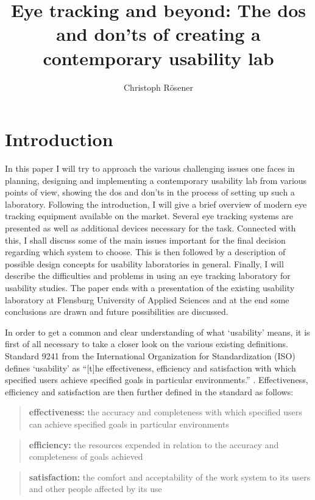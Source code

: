 \documentclass[output=paper]{langsci/langscibook}
\author{%
 Christoph Rösener
\affiliation{Johannes Gutenberg University of Mainz/Germersheim}
}
\title{Eye tracking and beyond: The dos and don'ts of creating a contemporary usability lab}
\begin{document}
\section{Introduction}

In this paper I will try to approach the various challenging issues one faces in planning, designing and implementing a contemporary usability lab from various points of view, showing the dos and don'ts in the process of setting up such a laboratory. Following the introduction, I will give a brief overview of modern eye tracking equipment available on the market. Several eye tracking systems are presented as well as additional devices necessary for the task. Connected with this, I shall discuss some of the main issues important for the final decision regarding which system to choose. This is then followed by a description of possible design concepts for usability laboratories in general. Finally, I will describe the difficulties and problems in using an eye tracking laboratory for usability studies. The paper ends with a presentation of the existing usability laboratory at Flensburg University of Applied Sciences and at the end some conclusions are drawn and future possibilities are discussed.


In order to get a common and clear understanding of what `usability' means, it is first of all necessary to take a closer look on the various existing definitions. Standard 9241 from the International Organization for Standardization (ISO) defines `usability' as ``[t]he effectiveness, efficiency and satisfaction with which specified users achieve specified goals in particular environments.'' \citep{ISO9241}. Effectiveness, efficiency and satisfaction are then further defined in the standard as follows: 


\begin{quote}
\textbf{effectiveness: }the accuracy and completeness with which specified users can achieve specified goals in particular environments
\end{quote}

\begin{quote}
\textbf{efficiency:} the resources expended in relation to the accuracy and completeness of goals achieved
\end{quote}

\begin{quote}
\textbf{satisfaction:} the comfort and acceptability of the work system to its users and other people affected by its use
\end{quote}
\end{document}
